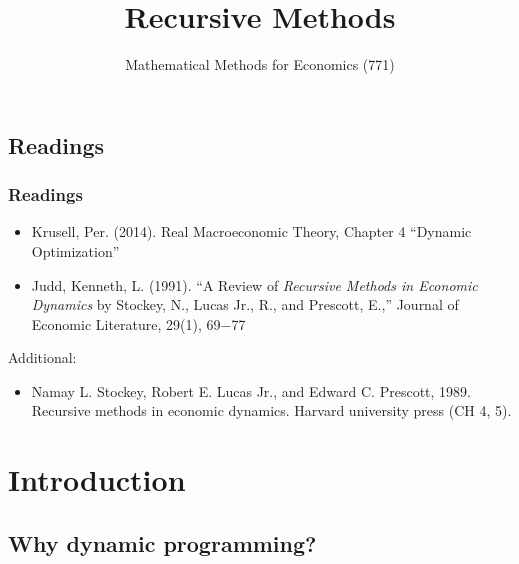 \documentclass[10pt, handout]{beamer}
\title [Recursive Methods]{Recursive Methods}
\subtitle{Mathematical Methods for Economics (771)}
\institute[Stellenbosch University]{\large{
Stellenbosch University}}
\date{}
\begin{document}
\frame{\titlepage}



\begin{frame}

\section{Readings}

\frametitle{Readings} \vskip 0.1in

\begin{itemize}
\item Krusell, Per. (2014). Real Macroeconomic Theory, Chapter 4 ``Dynamic Optimization''

\item Judd, Kenneth, L. (1991). ``A Review of \textit{Recursive Methods in Economic Dynamics} by Stockey, N., Lucas Jr., R., and Prescott, E.,'' Journal of Economic Literature, 29(1), 69$-$77
\end{itemize}

Additional:
\begin{itemize}
\item  Namay L. Stockey, Robert E. Lucas Jr., and Edward C. Prescott, 1989. Recursive methods in economic dynamics. Harvard university
press (CH 4, 5).
\end{itemize}


\end{frame}


\section{Introduction}
\subsection{Why dynamic programming?}
\end{document}
